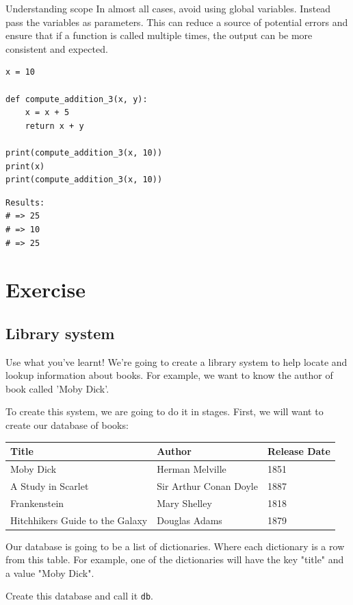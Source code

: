 \documentclass[10pt]{beamer}
\begin{document}
\begin{frame}[label={sec:orgd8170a5},fragile]{Understanding scope}
 In almost all cases, avoid using global variables. Instead pass the variables as
parameters. This can reduce a source of potential errors and ensure that if a
function is called multiple times, the output can be more consistent and expected.

\begin{verbatim}
x = 10

def compute_addition_3(x, y):
    x = x + 5
    return x + y

print(compute_addition_3(x, 10))
print(x)
print(compute_addition_3(x, 10))
\end{verbatim}

\begin{verbatim}
Results: 
# => 25
# => 10
# => 25
\end{verbatim}
\end{frame}

\section{Exercise}
\label{sec:org59ea9f4}

\subsection{Library system}
\label{sec:org2fbdcfd}

\begin{frame}[label={sec:orgce78d52},fragile]{Use what you've learnt!}
 We're going to create a library system to help locate and lookup information about
books. For example, we want to know the author of book called 'Moby Dick'.

To create this system, we are going to do it in stages. First, we will want to create
our database of books:

\begin{center}
\begin{tabularx}{\textwidth}{XXX}
\toprule
Title & Author & Release Date\\
\midrule
Moby Dick & Herman Melville & 1851\\
A Study in Scarlet & Sir Arthur Conan Doyle & 1887\\
Frankenstein & Mary Shelley & 1818\\
Hitchhikers Guide to the Galaxy & Douglas Adams & 1879\\
\bottomrule
\end{tabularx}
\end{center}

Our database is going to be a list of dictionaries. Where each dictionary is a row
from this table. For example, one of the dictionaries will have the key "title" and a
value "Moby Dick".

Create this database and call it \texttt{db}.
\end{frame}
\end{document}
